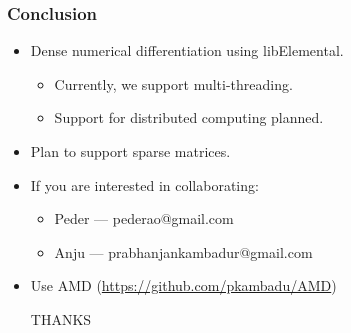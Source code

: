 \documentclass[dvipsnames,colorlinks=true,urlcolor=green]{beamer}
\newcounter{m}
\newcounter{c}
\def\trace{\mathop{\mathrm{trace}}}
\def\logdet{\mathrm{log\;det}}
\def\vx{\mathbf{x}}
\def\mX{\mathbf{X}}
\begin{document}
\begin{frame}

\frametitle{Conclusion} 

\begin{itemize}
\item Dense numerical differentiation using libElemental.

  \begin{itemize}
  \item Currently, we support multi-threading.
  \item Support for distributed computing planned.
  \end{itemize}

\item Plan to support sparse matrices.
\item If you are interested in collaborating:

  \begin{itemize}
  \item Peder --- pederao@gmail.com
  \item Anju  --- prabhanjankambadur@gmail.com
  \end{itemize}

\item Use AMD (\url{https://github.com/pkambadu/AMD})

\begin{center}
THANKS
\end{center}

\end{itemize}
\end{frame}
\end{document}
